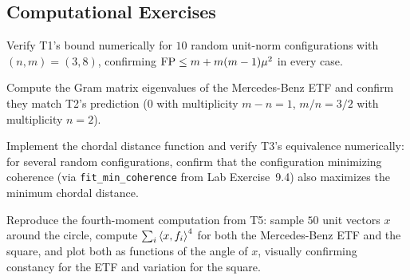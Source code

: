 \subsection*{Computational Exercises}
\begin{compexercises}
	\item Verify T1's bound numerically for $10$ random unit-norm
	configurations with $(n,m)=(3,8)$, confirming $\operatorname{FP}\le
	m+m(m-1)\mu^2$ in every case.
	
	\item Compute the Gram matrix eigenvalues of the Mercedes-Benz ETF and
	confirm they match T2's prediction ($0$ with multiplicity $m-n=1$,
	$m/n=3/2$ with multiplicity $n=2$).
	
	\item Implement the chordal distance function and verify T3's
	equivalence numerically: for several random configurations,
	confirm that the configuration minimizing coherence (via
	\texttt{fit\_min\_coherence} from Lab Exercise~9.4) also maximizes
	the minimum chordal distance.
	
	\item Reproduce the fourth-moment computation from T5: sample $50$
	unit vectors $x$ around the circle, compute
	$\sum_i\left\langle x, f_i \right\rangle^4$ for both the Mercedes-Benz ETF and the
	square, and plot both as functions of the angle of $x$, visually
	confirming constancy for the ETF and variation for the square.
\end{compexercises}
